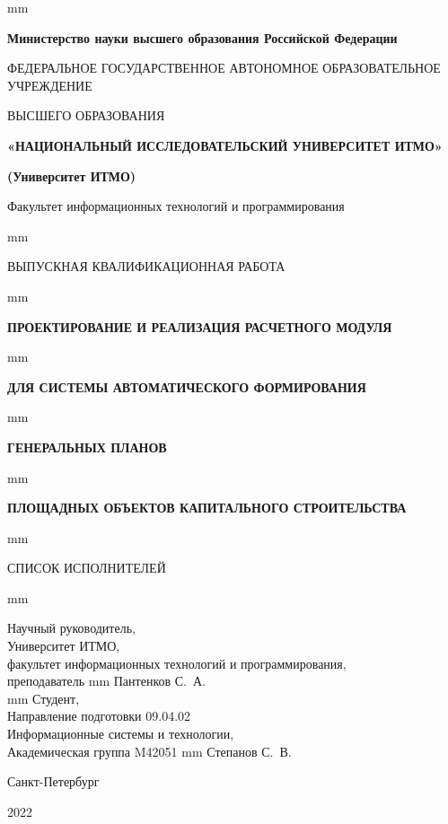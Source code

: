 \thispagestyle{empty}
 mm
\centerline{\footnotesize{\textbf{Министерство науки высшего образования Российской Федерации}}}
\centerline{\footnotesize{ФЕДЕРАЛЬНОЕ ГОСУДАРСТВЕННОЕ АВТОНОМНОЕ ОБРАЗОВАТЕЛЬНОЕ УЧРЕЖДЕНИЕ}}
\centerline{\small{ВЫСШЕГО ОБРАЗОВАНИЯ}}
\centerline{\textbf{«НАЦИОНАЛЬНЫЙ ИССЛЕДОВАТЕЛЬСКИЙ УНИВЕРСИТЕТ ИТМО»}}
\centerline{\textbf{(Университет ИТМО)}}
\centerline{Факультет информационных технологий и программирования}

 mm
\centerline{\LARGE{ВЫПУСКНАЯ КВАЛИФИКАЦИОННАЯ РАБОТА}}
 mm
\centerline{\large\textbf{ПРОЕКТИРОВАНИЕ И РЕАЛИЗАЦИЯ РАСЧЕТНОГО МОДУЛЯ}}
 mm
\centerline{\large\textbf{ДЛЯ СИСТЕМЫ АВТОМАТИЧЕСКОГО ФОРМИРОВАНИЯ}}
 mm
\centerline{\large\textbf{ГЕНЕРАЛЬНЫХ ПЛАНОВ}}
 mm
\centerline{\large\textbf{ПЛОЩАДНЫХ ОБЪЕКТОВ КАПИТАЛЬНОГО СТРОИТЕЛЬСТВА}}
 mm
\centerline{\large{СПИСОК ИСПОЛНИТЕЛЕЙ}}
 mm
\large{
\noindent
Научный руководитель, \\
Университет ИТМО, \\
факультет информационных технологий и программирования, \\
преподаватель  mm Пантенков С.~А.\\
 mm \noindent
Студент, \\
Направление подготовки 09.04.02 \\
Информационные системы и технологии, \\
Академическая группа M42051  mm Степанов С.~В.\\
\vfill \hfil \break
\centerline{\large Санкт-Петербург } \centerline{ 2022 }
}


